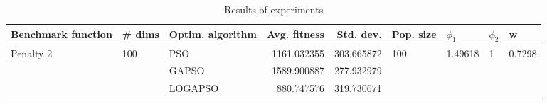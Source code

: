 \begin{table}
\centering
\caption{Results of experiments}
\begin{tabular}{lllrrllll}
\toprule
        Benchmark function &              \# dims & Optim. algorithm &  Avg. fitness &  Std. dev. &            Pop. size &               $\phi_{1}$ &         $\phi_{2}$ &                       w \\
\midrule
\multirow{3}{*}{Penalty 2} & \multirow{3}{*}{100} &              PSO &   1161.032355 & 303.665872 & \multirow{3}{*}{100} & \multirow{3}{*}{1.49618} & \multirow{3}{*}{1} & \multirow{3}{*}{0.7298} \\
                           &                      &            GAPSO &   1589.900887 & 277.932979 &                      &                          &                    &                         \\
                           &                      &          LOGAPSO &    880.747576 & 319.730671 &                      &                          &                    &                         \\
\bottomrule
\end{tabular}
\end{table}
